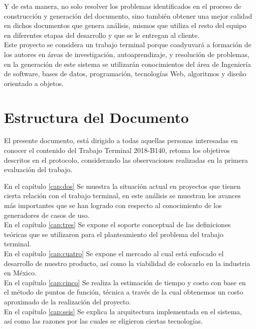 Y de esta manera, no solo resolver los problemas identificados en el proceso de construcción y generación del documento, sino también obtener una mejor calidad en dichos documentos que genera análisis, mismos que utiliza el resto del equipo en diferentes etapas del desarrollo y que se le entregan al cliente.\\

Este proyecto se considera un trabajo terminal porque coadyuvará a formación de los autores en áreas de investigación, autoaprendizaje, y resolución de problemas, en la generación de este sistema se utilizarán conocimientos del área de Ingeniería de software, bases de datos, programación, tecnologías Web, algoritmos y diseño orientado a objetos.

\section{Estructura del Documento}

El presente documento, está dirigido a todas aquellas personas interesadas en conocer el contenido del Trabajo Terminal 2018-B140, retoma los objetivos descritos en el protocolo, considerando las observaciones realizadas en la primera evaluación del trabajo. 


En el capítulo  \ref{cap:dos} Se muestra la situación actual en proyectos que tienen cierta relación con el trabajo terminal, en este análisis se muestran los avances más importantes que se han logrado con respecto al conocimiento de los generadores de casos de uso.\\

En el capítulo  \ref{cap:tres} Se expone el soporte conceptual de las definiciones teóricas que se utilizaron para el planteamiento del problema del trabajo terminal. \\

En el capítulo  \ref{cap:cuatro} Se expone el mercado al cual está enfocado el desarrollo de nuestro producto, así como la viabilidad de colocarlo en la industria en México.\\

En el capítulo  \ref{cap:cinco} Se realiza la estimación de tiempo y costo con base en el método de puntos de función, técnica a través de la cual obtenemos un costo aproximado de la realización del proyecto.\\

En el capítulo  \ref{cap:seis} Se explica la arquitectura implementada en el sistema, así como las razones por las cuales se eligieron ciertas tecnologías.\\

